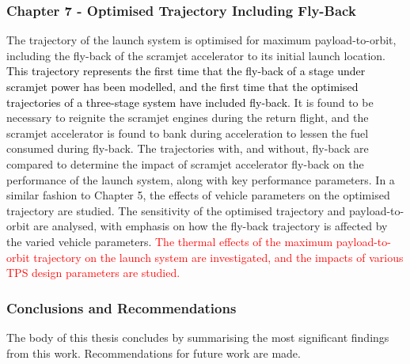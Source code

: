  
      
      \subsubsection*{Chapter 7 - Optimised Trajectory Including Fly-Back}
      
      The trajectory of the launch system is optimised for maximum payload-to-orbit, including the fly-back of the scramjet accelerator to its initial launch location. \textcolor{black}{This trajectory represents the first time that the fly-back of a stage under scramjet power has been modelled, and the first time that the optimised trajectories of a three-stage system have included fly-back}. 
      It is found to be necessary to reignite the scramjet engines during the return flight, and the scramjet accelerator is found to bank during acceleration to lessen the fuel consumed during fly-back.
      The trajectories with, and without, fly-back are compared to determine the impact of scramjet accelerator fly-back on the performance of the launch system, along with key performance parameters. 
      In a similar fashion to Chapter 5, the effects of vehicle parameters on the optimised trajectory are studied. The sensitivity of the optimised trajectory and payload-to-orbit are analysed, with emphasis on how the fly-back trajectory is affected by the varied vehicle parameters.
      \textcolor{red}{The thermal effects of the maximum payload-to-orbit trajectory on the launch system are investigated, and the impacts of various TPS design parameters are studied.}
     
      

    \subsubsection*{Conclusions and Recommendations}

      The body of this thesis concludes by summarising the most significant findings from this work. Recommendations for future work are made. 
      
      
      
